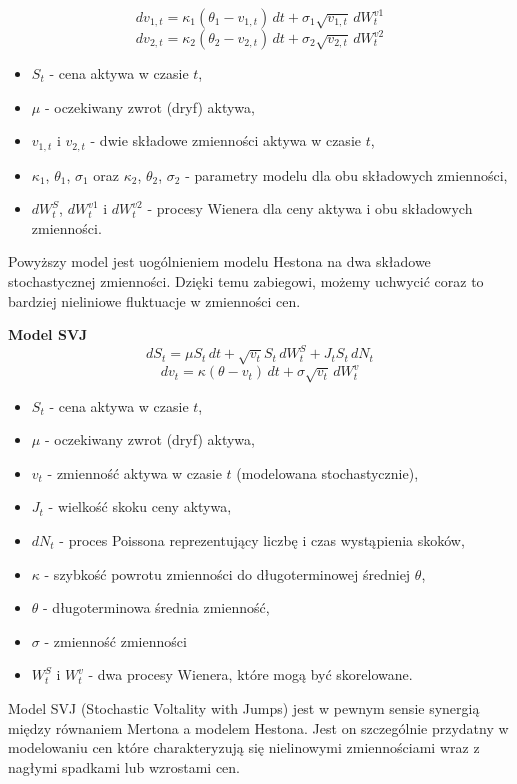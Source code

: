 \begin{equation}
dv_{1,t} = \kappa_1 (\theta_1 - v_{1,t}) \, dt + \sigma_1 \sqrt{v_{1,t}} \, dW_t^{v1}
\end{equation}
\begin{equation}
dv_{2,t} = \kappa_2 (\theta_2 - v_{2,t}) \, dt + \sigma_2 \sqrt{v_{2,t}} \, dW_t^{v2}
\end{equation}
\begin{itemize}
  \item \( S_t \) - cena aktywa w czasie \( t \),
  \item \( \mu \) - oczekiwany zwrot (dryf) aktywa,
  \item \( v_{1,t} \) i \( v_{2,t} \) - dwie składowe zmienności aktywa w czasie \( t \),
  \item \( \kappa_1 \), \( \theta_1 \), \( \sigma_1 \) oraz \( \kappa_2 \), \( \theta_2 \), \( \sigma_2 \) - parametry modelu dla obu składowych zmienności,
  \item \( dW_t^S \), \( dW_t^{v1} \) i \( dW_t^{v2} \) - procesy Wienera dla ceny aktywa i obu składowych zmienności.
\end{itemize}
Powyższy model jest uogólnieniem modelu Hestona na dwa składowe stochastycznej zmienności. Dzięki temu zabiegowi, możemy uchwycić coraz to bardziej nieliniowe fluktuacje w zmienności cen.
 \item \textbf{Model SVJ}
\begin{equation}
dS_t = \mu S_t \, dt + \sqrt{v_t} S_t \, dW_t^S + J_t S_t \, dN_t
\end{equation}
\begin{equation}
dv_t = \kappa (\theta - v_t) \, dt + \sigma \sqrt{v_t} \, dW_t^v
\end{equation}
\begin{itemize}
  \item \( S_t \) - cena aktywa w czasie \( t \),
  \item \( \mu \) - oczekiwany zwrot (dryf) aktywa,
  \item \( v_t \) - zmienność aktywa w czasie \( t \) (modelowana stochastycznie),
  \item \( J_t \) - wielkość skoku ceny aktywa,
  \item \( dN_t \) - proces Poissona reprezentujący liczbę i czas wystąpienia skoków,
  \item \( \kappa \) - szybkość powrotu zmienności do długoterminowej średniej \( \theta \),
  \item \( \theta \) - długoterminowa średnia zmienność,
  \item \( \sigma \) - zmienność zmienności
  \item \( W_t^S \) i \( W_t^v \) - dwa procesy Wienera, które mogą być skorelowane.
\end{itemize}
Model SVJ (Stochastic Voltality with Jumps) jest w pewnym sensie synergią między równaniem Mertona a modelem Hestona. Jest on szczególnie przydatny w modelowaniu cen które charakteryzują się nielinowymi zmiennościami wraz z nagłymi spadkami lub wzrostami cen.


